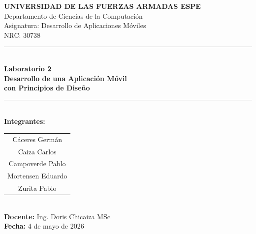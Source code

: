 \documentclass[12pt,a4paper]{article}
\begin{document}

\thispagestyle{portada}
\singlespacing
\setlength{\parskip}{0pt}
\vspace*{1.2cm}
\begin{center}
  {\Large\bfseries\color{espeblue}
    UNIVERSIDAD DE LAS FUERZAS ARMADAS ESPE\\[0.3cm]}
  {\large\color{espeblue}
    Departamento de Ciencias de la Computación\\[0.2cm]
    Asignatura: Desarrollo de Aplicaciones Móviles\\[0.2cm]
    NRC: 30738\\[0.6cm]}
  \textcolor{espeblue}{\rule{\linewidth}{1.5pt}}\\[0.4cm]
  {\LARGE\bfseries\color{espeblue}
    Laboratorio 2\\[0.25cm]
    Desarrollo de una Aplicación Móvil\\[0.15cm]
    con Principios de Diseño\\[0.35cm]}
  \textcolor{espeblue}{\rule{\linewidth}{1.5pt}}\\[1.0cm]
  {\large\bfseries Integrantes:}\\[0.4cm]
  \begin{tabular}{c}
    Cáceres Germán\\[0.15cm]
    Caiza Carlos\\[0.15cm]
    Campoverde Pablo\\[0.15cm]
    Mortensen Eduardo\\[0.15cm]
    Zurita Pablo\\
  \end{tabular}\\[1.5cm]
  {\large\textbf{Docente:} Ing. Doris Chicaiza MSc}\\[0.35cm]
  {\large\textbf{Fecha:} 4 de mayo de 2026}
\end{center}

\newpage
{}

\tableofcontents

\listoffigures

\listofalgorithms
{}

\end{document}
